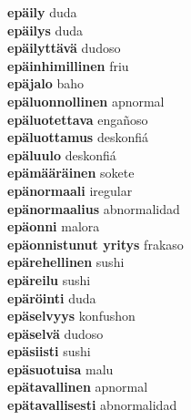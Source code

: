 \textbf{ epäily  } duda \\
\textbf{ epäilys  } duda \\
\textbf{ epäilyttävä  } dudoso \\
\textbf{ epäinhimillinen  } friu \\
\textbf{ epäjalo  } baho \\
\textbf{ epäluonnollinen  } apnormal \\
\textbf{ epäluotettava  } engañoso \\
\textbf{ epäluottamus  } deskonfiá \\
\textbf{ epäluulo  } deskonfiá \\
\textbf{ epämääräinen  } sokete \\
\textbf{ epänormaali  } iregular \\
\textbf{ epänormaalius  } abnormalidad \\
\textbf{ epäonni  } malora \\
\textbf{ epäonnistunut yritys  } frakaso \\
\textbf{ epärehellinen  } sushi \\
\textbf{ epäreilu  } sushi \\
\textbf{ epäröinti  } duda \\
\textbf{ epäselvyys  } konfushon \\
\textbf{ epäselvä  } dudoso \\
\textbf{ epäsiisti  } sushi \\
\textbf{ epäsuotuisa  } malu \\
\textbf{ epätavallinen  } apnormal \\
\textbf{ epätavallisesti  } abnormalidad \\
